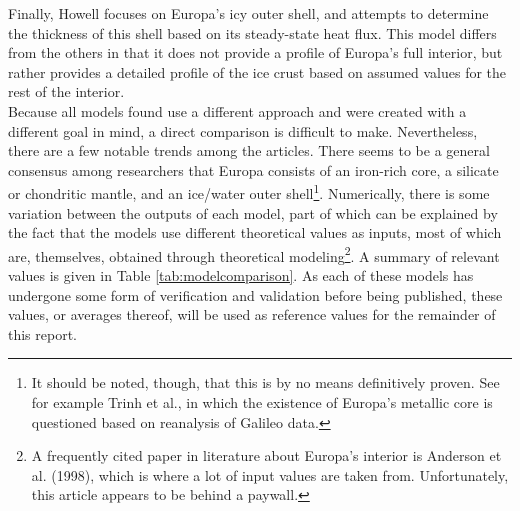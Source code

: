 \documentclass[twocolumn]{article}
\begin{document}
Finally, Howell\cite{howellLikelyThicknessEuropas2021} focuses on Europa's icy outer shell, and attempts to determine the thickness of this shell based on its steady-state heat flux. This model differs from the others in that it does not provide a profile of Europa's full interior, but rather provides a detailed profile of the ice crust based on assumed values for the rest of the interior.\\
Because all models found use a different approach and were created with a different goal in mind, a direct comparison is difficult to make. Nevertheless, there are a few notable trends among the articles. There seems to be a general consensus among researchers that Europa consists of an iron-rich core, a silicate or chondritic mantle, and an ice/water outer shell\footnote{It should be noted, though, that this is by no means definitively proven. See for example Trinh et al.\cite{trinhSlowEvolutionEuropas2023}, in which the existence of Europa's metallic core is questioned based on reanalysis of Galileo data.}. Numerically, there is some variation between the outputs of each model, part of which can be explained by the fact that the models use different theoretical values as inputs, most of which are, themselves, obtained through theoretical modeling\footnote{A frequently cited paper in literature about Europa's interior is Anderson et al. (1998)\cite{andersonEuropasDifferentiatedInternal1998}, which is where a lot of input values are taken from. Unfortunately, this article appears to be behind a paywall.}. A summary of relevant values is given in Table \ref{tab:modelcomparison}. As each of these models has undergone some form of verification and validation before being published, these values, or averages thereof, will be used as reference values for the remainder of this report.
\end{document}
